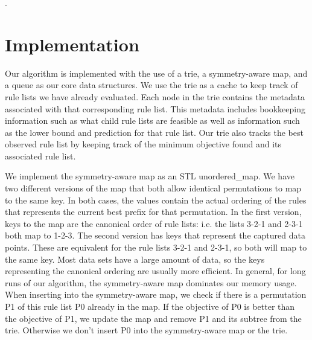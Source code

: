 \documentclass[sigconf]{acmart}
\begin{document}




\maketitle

\citet{YangRuSe16}.

\section{Implementation}

Our algorithm is implemented with the use of a trie, a symmetry-aware map, and a queue as our core data structures. We use the trie as a cache to keep track of rule lists we have already evaluated. Each node in the trie contains the metadata associated with that corresponding rule list. This metadata includes bookkeeping information such as what child rule lists are feasible as well as information such as the lower bound and prediction for that rule list. Our trie also tracks the best observed rule list by keeping track of the minimum objective found and its associated rule list.

We implement the symmetry-aware map as an STL unordered\_map. We have two different versions of the map that both allow identical permutations to map to the same key. In both cases, the values contain the actual ordering of the rules that represents the current best prefix for that permutation. In the first version, keys to the map are the canonical order of rule lists: i.e. the lists 3-2-1 and 2-3-1 both map to 1-2-3. The second version has keys that represent the captured data points. These are equivalent for the rule lists 3-2-1 and 2-3-1, so both will map to the same key. Most data sets have a large amount of data, so the keys representing the canonical ordering are usually more efficient. In general, for long runs of our algorithm, the symmetry-aware map dominates our memory usage. When inserting into the symmetry-aware map, we check if there is a permutation P1 of this rule list P0 already in the map. If the objective of P0 is better than the objective of P1, we update the map and remove P1 and its subtree from the trie. Otherwise we don't insert P0 into the symmetry-aware map or the trie.
\end{document}
